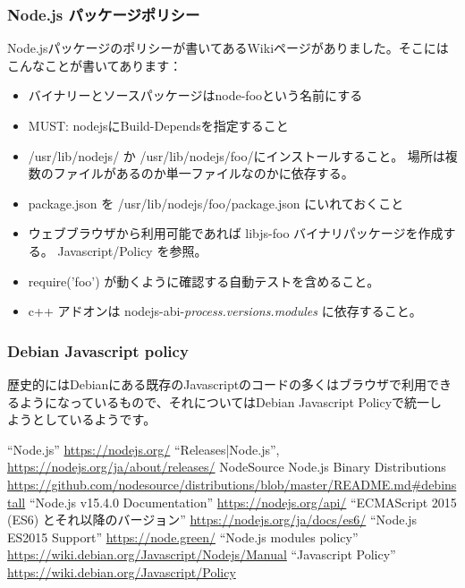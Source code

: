 \documentclass[mingoth,a4paper]{jsarticle}
\begin{document}
\subsubsection{Node.js パッケージポリシー}

Node.jsパッケージのポリシーが書いてあるWikiページがありました\cite{debian-nodejs-manual}。そこにはこんなことが書いてあります：

\begin{itemize}
 \item バイナリーとソースパッケージはnode-fooという名前にする

 \item MUST: nodejsにBuild-Dependsを指定すること

 \item /usr/lib/nodejs/ か /usr/lib/nodejs/foo/にインストールすること。
	場所は複数のファイルがあるのか単一ファイルなのかに依存する。
 \item package.json を /usr/lib/nodejs/foo/package.json にいれておくこと

 \item ウェブブラウザから利用可能であれば libjs-foo バイナリパッケージを作成する。 Javascript/Policy を参照。

 \item require('foo') が動くように確認する自動テストを含めること。

 \item c++ アドオンは nodejs-abi-{\it process.versions.modules} に依存すること。

\end{itemize}

\subsubsection{Debian Javascript policy}

歴史的にはDebianにある既存のJavascriptのコードの多くはブラウザで利用でき
るようになっているもので、それについてはDebian Javascript Policyで統一し
ようとしているようです\cite{debian-javascript-policy}。




\begin{thebibliography}{1}
  ``Node.js'' \url{https://nodejs.org/}
  ``Releases|Node.js'', \url{https://nodejs.org/ja/about/releases/}
  NodeSource Node.js Binary Distributions
	 \url{https://github.com/nodesource/distributions/blob/master/README.md#debinstall}
  ``Node.js v15.4.0 Documentation''  \url{https://nodejs.org/api/}
  ``ECMAScript 2015 (ES6) とそれ以降のバージョン''
	 \url{https://nodejs.org/ja/docs/es6/}
  ``Node.js ES2015 Support'' \url{https://node.green/}
	 ``Node.js modules policy'' 
	 \url{https://wiki.debian.org/Javascript/Nodejs/Manual}
	 ``Javascript Policy''
	 \url{https://wiki.debian.org/Javascript/Policy}

\end{thebibliography}
\end{document}
